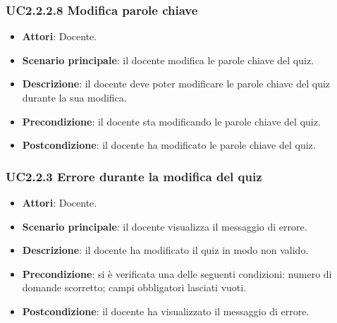 \subsubsection{UC2.2.2.8 Modifica parole chiave}
\begin{itemize}
\item \textbf{Attori}: Docente.
\item \textbf{Scenario principale}: il docente modifica le parole chiave del quiz.
\item \textbf{Descrizione}: il docente deve poter modificare le parole chiave del quiz durante la sua modifica.
\item \textbf{Precondizione}: il docente sta modificando le parole chiave del quiz.
\item \textbf{Postcondizione}: il docente ha modificato le parole chiave del quiz.
\end{itemize}
\subsubsection{UC2.2.3 Errore durante la modifica del quiz}
\begin{itemize}
\item \textbf{Attori}: Docente.
\item \textbf{Scenario principale}: il docente visualizza il messaggio di errore.
\item \textbf{Descrizione}: il docente ha modificato il quiz in modo non valido.
\item \textbf{Precondizione}: si è verificata una delle seguenti condizioni: numero di domande scorretto; campi obbligatori lasciati vuoti.
\item \textbf{Postcondizione}: il docente ha visualizzato il messaggio di errore.
\end{itemize}
